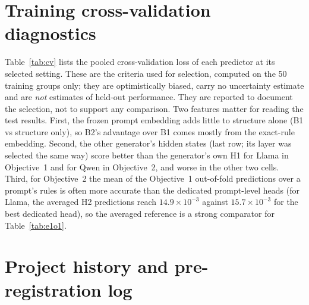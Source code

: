 \documentclass{article}
\begin{document}
\clearpage
\section{Training cross-validation diagnostics}
\label{app:cv}

Table~\ref{tab:cv} lists the pooled cross-validation loss of each predictor at its selected setting. These are the
criteria used for selection, computed on the 50 training groups only; they are optimistically biased, carry no
uncertainty estimate and are \emph{not} estimates of held-out performance. They are reported to document the selection,
not to support any comparison. Two features matter for reading the test results. First, the frozen prompt embedding
adds little to structure alone (B1 vs structure only), so B2's advantage over B1 comes mostly from the exact-rule
embedding. Second, the other generator's hidden states (last row; its layer was selected the same way) score better
than the generator's own H1 for Llama in Objective~1 and for Qwen in Objective~2, and worse in the other two cells. Third, for Objective~2 the mean of the Objective~1 out-of-fold predictions over a
prompt's rules is often more accurate than the dedicated prompt-level heads (for Llama, the averaged H2 predictions
reach $14.9\times10^{-3}$ against $15.7\times10^{-3}$ for the best dedicated head), so the averaged reference is a strong
comparator for Table~\ref{tab:e1o1}.

\begin{table}[h]
\centering\footnotesize
\caption{Training cross-validation loss at the selected setting (5 grouped folds over the 50 training groups) and the
number of input features. Objective~1: pooled mean log loss per completion. Objective~2: pooled squared error of
$\hat q$, $\times10^3$. Generated from \texttt{results/v2\_s3/tables/selected\_settings.csv}.}
\label{tab:cv}
\setlength{\tabcolsep}{2.8pt}

\end{table}

\section{Project history and pre-registration log}
\label{app:history}
\end{document}
